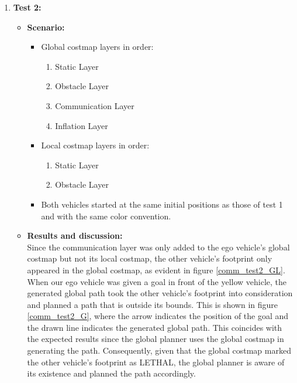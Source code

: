 \begin{itemize}
\begin{enumerate}
\begin{itemize}
            \end{itemize}

        \item \textbf{Test 2:}
            \begin{itemize}
                \item \textbf{Scenario:}
                \begin{itemize}
                    \item Global costmap layers in order:
                \begin{enumerate}
                    \item Static Layer
                    \item Obstacle Layer
                    \item Communication Layer
                    \item Inflation Layer
                \end{enumerate}
                    \item Local costmap layers in order:
                \begin{enumerate}
                    \item Static Layer
                    \item Obstacle Layer
                \end{enumerate}
                    \item Both vehicles started at the same initial positions as those of test 1 and with the same color convention.
                \end{itemize}
                \item \textbf{Results and discussion:} \\
                Since the communication layer was only added to the ego vehicle’s global costmap but not its local costmap, the other vehicle’s footprint only appeared in the global costmap, as evident in figure \ref{comm_test2_GL}. When our ego vehicle was given a goal in front of the yellow vehicle, the generated global path took the other vehicle’s footprint into consideration and planned a path that is outside its bounds. This is shown in figure \ref{comm_test2_G}, where the arrow indicates the position of the goal and the drawn line indicates the generated global path. This coincides with the expected results since the global planner uses the global costmap in generating the path. Consequently, given that the global costmap marked the other vehicle’s footprint as LETHAL, the global planner is aware of its existence and planned the path accordingly.
                

\end{itemize}
\end{enumerate}
\end{itemize}
